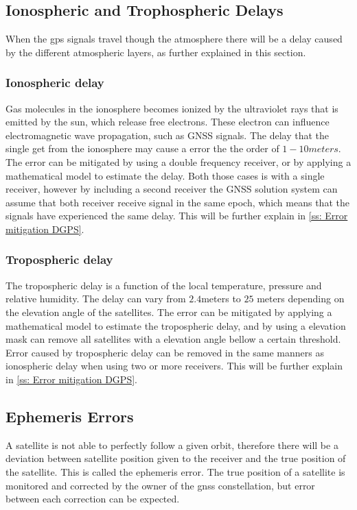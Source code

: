 \subsection{Ionospheric and Trophospheric Delays}
When the \gls{gps} signals travel though the atmosphere there will be a delay caused by the different atmospheric layers, as further explained in this section.
\subsubsection{Ionospheric delay}
Gas molecules in the ionosphere becomes ionized by the ultraviolet rays that is emitted by the sun, which release free electrons. These electron can influence electromagnetic wave propagation, such as GNSS signals. The delay that the single get from the ionosphere may cause a error the the order of $1-10 meters$. The error can be mitigated by using a double frequency receiver, or by applying a mathematical model to estimate the delay. Both those cases is with a single receiver, however by including a second receiver the GNSS solution system can assume that both receiver receive signal in the same epoch, which means that the signals have experienced the same delay. This will be further explain in \ref{ss: Error mitigation DGPS}.

\subsubsection{Tropospheric delay}
The tropospheric delay is a function of the local temperature, pressure and relative humidity. The delay can vary from $2.4$meters to $25$ meters depending on the elevation angle of the satellites. The error can be mitigated by applying a mathematical model to estimate the tropospheric delay, and by using a elevation mask can remove all satellites with a elevation angle bellow a certain threshold. Error caused by tropospheric delay can be removed in the same manners as ionospheric delay when using two or more receivers. This will be further explain in \ref{ss: Error mitigation DGPS}.

\subsection{Ephemeris Errors}
A satellite is not able to perfectly follow a given orbit, therefore there will be a deviation between satellite position given to the receiver and the true position of the satellite. This is called the ephemeris error. The true position of a satellite is monitored and corrected by the owner of the \gls{gnss} constellation, but error between each correction can be expected.
